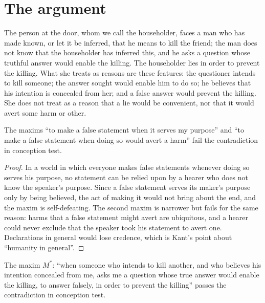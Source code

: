 \documentclass{situationist-preprint}
\begin{document}
\section{The argument}

The person at the door, whom we call the householder, faces a man who has made known, or let it be inferred, that he means to kill the friend; the man does not know that the householder has inferred this, and he asks a question whose truthful answer would enable the killing. The householder lies in order to prevent the killing. What she treats as reasons are these features: the questioner intends to kill someone; the answer sought would enable him to do so; he believes that his intention is concealed from her; and a false answer would prevent the killing. She does not treat as a reason that a lie would be convenient, nor that it would avert some harm or other.

\begin{lemma}\label{l:coarse}
The maxims \enquote{to make a false statement when it serves my purpose} and \enquote{to make a false statement when doing so would avert a harm} fail the contradiction in conception test.
\end{lemma}

\begin{proof}
In a world in which everyone makes false statements whenever doing so serves his purpose, no statement can be relied upon by a hearer who does not know the speaker's purpose. Since a false statement serves its maker's purpose only by being believed, the act of making it would not bring about the end, and the maxim is self-defeating. The second maxim is narrower but fails for the same reason: harms that a false statement might avert are ubiquitous, and a hearer could never exclude that the speaker took his statement to avert one. Declarations in general would lose credence, which is Kant's point about \enquote{humanity in general}.
\end{proof}

\begin{lemma}\label{l:fine}
The maxim $M^\ast$: \enquote{when someone who intends to kill another, and who believes his intention concealed from me, asks me a question whose true answer would enable the killing, to answer falsely, in order to prevent the killing} passes the contradiction in conception test.
\end{lemma}
\end{document}
